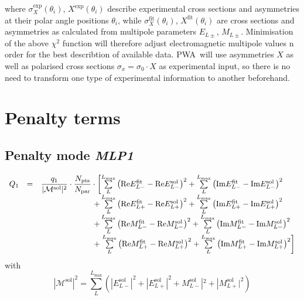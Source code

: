 \documentclass[a4paper,10pt]{article}
\def\PWA{\ttfamily PWA\rmfamily\ }
\def\Re{\mathrm{Re}}
\def\Im{\mathrm{Im}}
\begin{document}
where $\sigma_X^\mathrm{exp}(\theta_i)$, $X^\mathrm{exp}(\theta_i)$ describe experimental cross sections and asymmetries
at their polar angle positions $\theta_i$, while 
$\sigma_X^\mathrm{fit}(\theta_i)$, $X^\mathrm{fit}(\theta_i)$ are cross sections and asymmetries as calculated from
multipole parameters $E_{L\pm}$, $M_{L\pm}$.
Minimisation of the above $\chi^2$ function will therefore adjust electromagnetic multipole values n order for the best describtion
of available data.
\PWA will use asymmetries $X$ as well as polarised cross sections $\sigma_x = \sigma_0\cdot X$ as experimental input,
so there is no need to transform one type of experimental information to another beforehand.

\section{Penalty terms}

\subsection{Penalty mode \textit{MLP1}}
\begin{displaymath}
\begin{array}{lcl}
 Q_1 &=& \dfrac{q_1}{|\mathcal{M}^\mathrm{sol}|^2}\cdot \dfrac{N_\mathrm{pts}}{N_\mathrm{par}} \cdot \left[
\sum\limits_L^{L_\mathrm{max}}\left(\Re E_{L-}^\mathrm{fit} - \Re E_{L-}^\mathrm{sol}\right)^2
+
\sum\limits_L^{L_\mathrm{max}}\left(\Im E_{L-}^\mathrm{fit} - \Im E_{L-}^\mathrm{sol}\right)^2\right.\\
&&\hspace{6.73em}+
\sum\limits_L^{L_\mathrm{max}}\left(\Re E_{L+}^\mathrm{fit} - \Re E_{L+}^\mathrm{sol}\right)^2
+
\sum\limits_L^{L_\mathrm{max}}\left(\Im E_{L+}^\mathrm{fit} - \Im E_{L+}^\mathrm{sol}\right)^2\\
&&\hspace{6.73em}+
\sum\limits_L^{L_\mathrm{max}}\left(\Re M_{L-}^\mathrm{fit} - \Re M_{L-}^\mathrm{sol}\right)^2
+
\sum\limits_L^{L_\mathrm{max}}\left(\Im M_{L-}^\mathrm{fit} - \Im M_{L-}^\mathrm{sol}\right)^2\\
&&\hspace{6.73em}+\left.
\sum\limits_L^{L_\mathrm{max}}\left(\Re M_{L+}^\mathrm{fit} - \Re M_{L+}^\mathrm{sol}\right)^2
+
\sum\limits_L^{L_\mathrm{max}}\left(\Im M_{L+}^\mathrm{fit} - \Im M_{L+}^\mathrm{sol}\right)^2
\right]
\end{array}
\end{displaymath}
with
\begin{displaymath}
 |\mathcal{M}^\mathrm{sol}|^2 = \sum\limits_L^{L_\mathrm{max}}
\left(|E_{L-}^\mathrm{sol}|^2 + |E_{L+}^\mathrm{sol}|^2 + M_{L-}^\mathrm{sol}|^2 + |M_{L+}^\mathrm{sol}|^2\right)
\end{displaymath}
\end{document}
